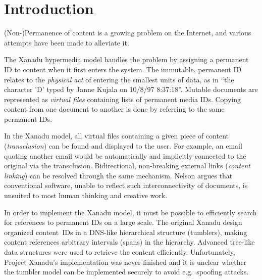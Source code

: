 \documentclass{sig-alternate}
\begin{document}

\def\diff{{\tt diff}}

\def\unfin{\tiny}
\def\fin{\normalsize}


\section{Introduction}

(Non-)Permanence of content is a growing problem
on the Internet, and various attempts have been made to 
alleviate it\cite{waybackmachine,simonson-content-permanence,freenet-ieee}.

The Xanadu hypermedia 
model\cite{ted-xu-vision,ted-xu-model,ted-xanalogical-structure-needed}
handles the problem by 
assigning a permanent ID to content when it first 
enters the system.
The immutable, permanent ID relates to the \emph{physical act} 
of entering the smallest units of data,
as in ``the character 'D' typed by Janne Kujala on 10/8/97 8:37:18''.
Mutable documents are represented as \emph{virtual files} containing
lists of permanent media IDs.
Copying content from one document to another is done by referring
to the same permanent IDs. 

In the Xanadu model, 
all virtual files containing a given piece
of content (\emph{transclusion}) can be found and displayed to the user.
For example, an email quoting another email would be 
automatically and implicitly connected
to the original via the transclusion.
Bidirectional, non-breaking external links 
(\emph{content linking}) can be resolved
through the same mechanism.
Nelson\cite{ted-xanalogical-structure-needed} argues that conventional
software, unable to reflect such interconnectivity of documents, is
unsuited to most human thinking and creative work.

In order to implement the Xanadu model, it must be possible to 
efficiently search for references to permanent IDs on a large
scale.
The original Xanadu design organized
content~IDs in a DNS-like hierarchical structure (tumblers), making content
references arbitrary intervals (spans) in the hierarchy. 
Advanced
tree-like data structures\cite{ted-xu-tech} were used to retrieve the content
efficiently.
Unfortunately,
Project Xanadu's implementation was never finished
and it is unclear whether the tumbler model can be implemented
securely to avoid e.g.~spoofing attacks.
\end{document}

